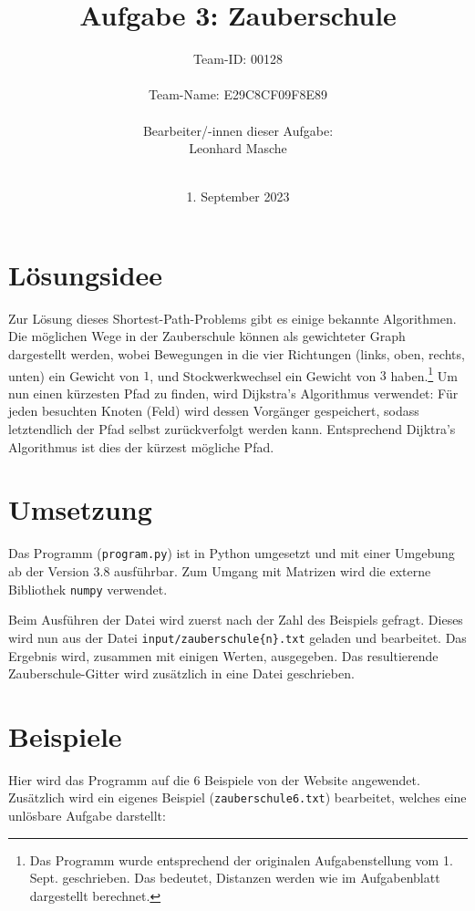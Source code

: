 \documentclass[a4paper,12pt]{scrartcl}
\title{\textbf{\Huge Aufgabe 3: Zauberschule}}
\author{\LARGE Team-ID: \LARGE 00128 \\\\
	    \LARGE Team-Name: \LARGE E29C8CF09F8E89 \\\\
	    \LARGE Bearbeiter/-innen dieser Aufgabe: \\ 
	    \LARGE Leonhard Masche\\\\}
\date{\LARGE1. September 2023}
\theoremstyle{definition}
\begin{document}
\maketitle
\tableofcontents
\section{Lösungsidee}

Zur Lösung dieses Shortest-Path-Problems gibt es einige bekannte Algorithmen.
Die möglichen Wege in der Zauberschule können als gewichteter Graph dargestellt
werden, wobei Bewegungen in die vier Richtungen (links, oben, rechts, unten) ein
Gewicht von $1$, und Stockwerkwechsel ein Gewicht von $3$ haben.\footnote{
	Das Programm wurde entsprechend der originalen Aufgabenstellung vom 1. Sept.
	geschrieben. Das bedeutet, Distanzen werden wie im Aufgabenblatt dargestellt
	berechnet.} Um nun einen
kürzesten Pfad zu finden, wird Dijkstra's Algorithmus verwendet: Für jeden
besuchten Knoten (Feld) wird dessen Vorgänger gespeichert, sodass letztendlich
der Pfad selbst zurückverfolgt werden kann. Entsprechend Dijktra's Algorithmus
ist dies der kürzest mögliche Pfad.


\section{Umsetzung}

Das Programm (\texttt{program.py}) ist in Python umgesetzt und mit einer Umgebung ab
der Version 3.8 ausführbar. Zum Umgang mit Matrizen wird die externe
Bibliothek \texttt{numpy} verwendet.

Beim Ausführen der Datei wird zuerst nach der Zahl des Beispiels gefragt. Dieses
wird nun aus der Datei \texttt{input/zauberschule\{n\}.txt} geladen und bearbeitet. Das
Ergebnis wird, zusammen mit einigen Werten, ausgegeben. Das resultierende
Zauberschule-Gitter wird zusätzlich in eine Datei geschrieben.

\section{Beispiele}

Hier wird das Programm auf die 6 Beispiele von der Website angewendet.
Zusätzlich wird ein eigenes Beispiel (\texttt{zauberschule6.txt}) bearbeitet, welches
eine unlösbare Aufgabe darstellt:
\end{document}

